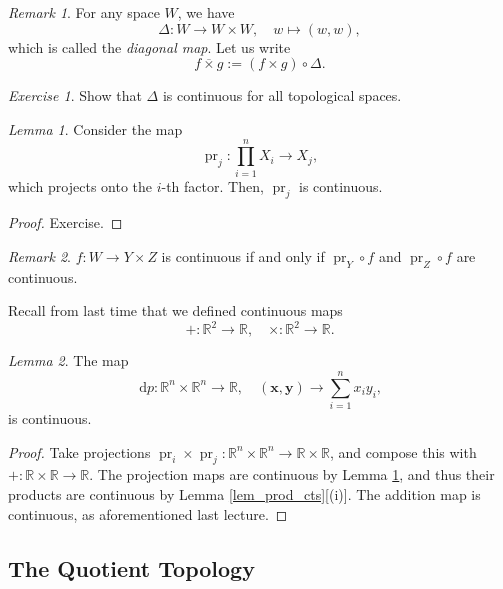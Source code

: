 \documentclass[a4paper]{report}
\theoremstyle{definition}
\theoremstyle{remark}
\newtheorem{remark}{Remark}
\theoremstyle{proposition}
\theoremstyle{conjecture}
\theoremstyle{lemma}
\newtheorem{lemma}{Lemma}
\theoremstyle{corollary}
\theoremstyle{exercise}
\newtheorem{exercise}{Exercise}
\newcommand{\diff}{\,\mathrm{d}}
\newcommand{\on}{\operatorname}
\begin{document}
\begin{remark}
    For any space $W$, we have $$\Delta : W \longrightarrow W \times W,\quad w \longmapsto (w,w),$$
    which is called the \emph{diagonal map}.
    Let us write 
    $$f \overline{\times} g := (f\times g)\circ \Delta.$$
\end{remark}

\begin{exercise}
    Show that $\Delta$ is continuous for all topological spaces.
\end{exercise}

\begin{lemma}\label{lem_proj_cts}
    Consider the map 
    $$\on{pr}_j : \prod_{i=1}^n X_i \longrightarrow X_j,$$
    which projects onto the $i$-th factor. 
    Then, $\on{pr}_j$ is continuous.
\end{lemma}

\begin{proof}
    Exercise.
\end{proof}

\begin{remark}
    $f : W \to Y \times Z$ is continuous if and only if 
    $\on{pr}_Y \circ f$ and $\on{pr}_Z \circ f$ are continuous.
\end{remark}

Recall from last time that we defined continuous maps 
$$ + : \mathbb{R}^2 \longrightarrow \mathbb{R}, \quad \times : \mathbb{R}^2 \longrightarrow \mathbb{R}.$$

\begin{lemma}
    The map
    $$\diff p : \mathbb{R}^n \times \mathbb{R}^n \longrightarrow \mathbb{R},\quad (\mathbf{x},\mathbf{y}) \longrightarrow \sum_{i=1}^n x_iy_i,$$
    is continuous.
\end{lemma}

\begin{proof}
    Take projections $\on{pr}_i \times \on{pr}_j : \mathbb{R}^n \times \mathbb{R}^n \to \mathbb{R} \times \mathbb{R}$,
    and compose this with $+ : \mathbb{R} \times \mathbb{R} \to \mathbb{R}$.
    The projection maps are continuous by Lemma \ref{lem_proj_cts}, and thus their products are continuous by Lemma \ref{lem_prod_cts}[(i)].
    The addition map is continuous, as aforementioned last lecture.
\end{proof}

\subsection{The Quotient Topology}
\end{document}
